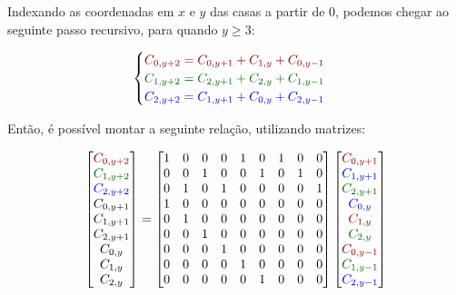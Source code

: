 Indexando as coordenadas em $x$ e $y$ das casas a partir de $0$, podemos chegar ao seguinte passo recursivo, para quando $y \geq 3$:

\begin{equation}
    \begin{cases}
        \red{C_{0,y+2} = C_{0,y+1} + C_{1,y} + C_{0,y-1}} \\
        \green{C_{1,y+2} = C_{2,y+1} + C_{2,y} + C_{1,y-1}} \\
        \blue{C_{2,y+2} = C_{1,y+1} + C_{0,y} + C_{2,y-1}}
    \end{cases}
\end{equation}

Então, é possível montar a seguinte relação, utilizando matrizes:

\[
\begin{bmatrix}
    \red{C_{0,y+2}} \\ \green{C_{1,y+2}} \\ \blue{C_{2,y+2}} \\ C_{0,y+1} \\ C_{1,y+1} \\ C_{2,y+1} \\ C_{0,y} \\ C_{1,y} \\ C_{2,y}
\end{bmatrix}
=
\begin{bmatrix}
    1&0&0&0&1&0&1&0&0 \\
    0&0&1&0&0&1&0&1&0 \\
    0&1&0&1&0&0&0&0&1 \\
    1&0&0&0&0&0&0&0&0 \\
    0&1&0&0&0&0&0&0&0 \\
    0&0&1&0&0&0&0&0&0 \\
    0&0&0&1&0&0&0&0&0 \\
    0&0&0&0&1&0&0&0&0 \\
    0&0&0&0&0&1&0&0&0
\end{bmatrix}
\begin{bmatrix}
    \red{C_{0,y+1}} \\ \blue{C_{1,y+1}} \\ \green{C_{2,y+1}} \\ \blue{C_{0,y}} \\ \red{C_{1,y}} \\ \green{C_{2,y}} \\ \red{C_{0,y-1}} \\ \green{C_{1,y-1}} \\ \blue{C_{2,y-1}}
\end{bmatrix}
\]

